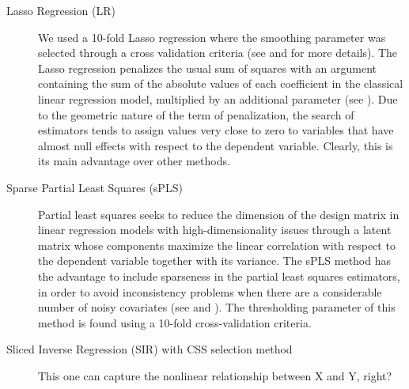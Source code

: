 \documentclass[11pt]{amsart}
\theoremstyle{plain}
\theoremstyle{definition}
\theoremstyle{remark}
\begin{document}
\begin{description}
\item[Lasso Regression (LR)]
We used a 10-fold Lasso regression where the smoothing parameter was selected
through a cross validation criteria (see \cite{Tibshirani1996} and \cite{Friedman2010} for more details). %
 The Lasso regression penalizes the usual sum of squares with an argument
 containing the sum of the absolute values of each coefficient in the classical
 linear regression model, multiplied by an additional parameter (see \cite{Tibshirani1996}). Due
 to the geometric nature of the term of penalization, the search of estimators
 tends to assign values very close to zero to variables that have almost null
 effects with respect to the dependent variable. Clearly, this is its main advantage
 over other methods.
\item[Sparse Partial Least Squares (sPLS)] 
  Partial least squares seeks to reduce the dimension of the design matrix in
  linear regression models with high-dimensionality issues through a latent matrix
  whose components maximize the linear correlation with respect to the
  dependent variable together with its variance. The sPLS method has the advantage to include sparseness in the partial least squares
  estimators, in order to avoid inconsistency problems when there are a
  considerable number of noisy covariates (see \cite{Chun2010} and \cite{Chung2013}). The
  thresholding parameter of this method is found using a 10-fold cross-validation criteria.    
\item[Sliced Inverse Regression (SIR) with CSS selection method]
This one can capture the nonlinear relationship between X and Y, right?


\end{description}
\end{document}
